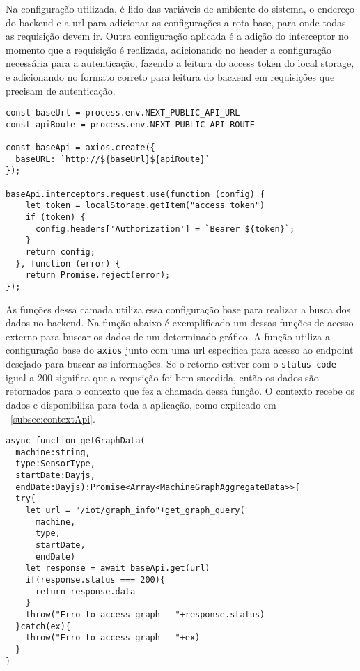 Na configuração utilizada, é lido das variáveis de ambiente do sistema, o endereço do backend e a url para adicionar as configurações a rota base, para onde todas as requisição devem ir. Outra configuração aplicada é a adição do interceptor no momento que a requisição é realizada, adicionando no header a configuração necessária para a autenticação, fazendo a leitura do access token do local storage, e adicionando no formato correto para leitura do backend em requisições que precisam de autenticação.

\begin{verbatim}
const baseUrl = process.env.NEXT_PUBLIC_API_URL
const apiRoute = process.env.NEXT_PUBLIC_API_ROUTE

const baseApi = axios.create({
  baseURL: `http://${baseUrl}${apiRoute}`
});

baseApi.interceptors.request.use(function (config) {
    let token = localStorage.getItem("access_token")
    if (token) {
      config.headers['Authorization'] = `Bearer ${token}`;
    }
    return config;
  }, function (error) {
    return Promise.reject(error);
});
\end{verbatim}

As funções dessa camada utiliza essa configuração base para realizar a busca dos dados no backend. Na função abaixo é exemplificado um dessas funções de acesso externo para buscar os dados de um determinado gráfico. A função utiliza a configuração base do \texttt{axios} junto com uma url especifica para acesso ao endpoint desejado para buscar as informações. Se o retorno estiver com o \texttt{status code} igual a 200 significa que a requsição foi bem sucedida, então os dados são retornados para o contexto que fez a chamada dessa função. O contexto recebe os dados e disponibiliza para toda a aplicação, como explicado em ~\ref{subsec:contextApi}.

\begin{verbatim}
async function getGraphData(
  machine:string,
  type:SensorType,
  startDate:Dayjs,
  endDate:Dayjs):Promise<Array<MachineGraphAggregateData>>{
  try{
    let url = "/iot/graph_info"+get_graph_query(
      machine,
      type,
      startDate,
      endDate)
    let response = await baseApi.get(url)
    if(response.status === 200){
      return response.data
    }
    throw("Erro to access graph - "+response.status)
  }catch(ex){
    throw("Erro to access graph - "+ex)
  }
}
\end{verbatim}


